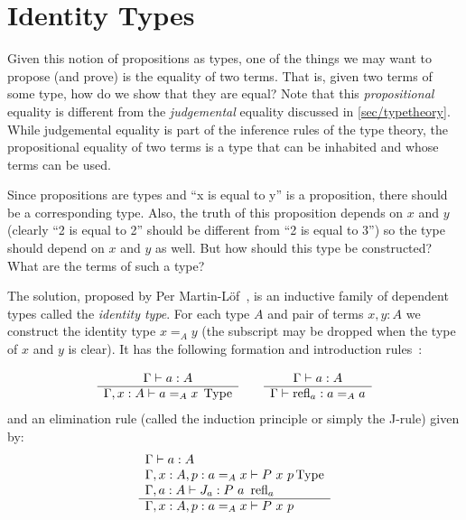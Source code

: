 \section{Identity Types}\label{sec/identitytypes}

Given this notion of propositions as types, one of the things we may want to
propose (and prove) is the equality of two terms. That is, given two terms of
some type, how do we show that they are equal? Note that this
\emph{propositional} equality is different from the \emph{judgemental} equality
discussed in \autoref{sec/typetheory}. While judgemental equality is part of the
inference rules of the type theory, the propositional equality of two terms is a
type that can be inhabited and whose terms can be used. 

Since propositions are types and ``x is equal to y'' is a proposition, there
should be a corresponding type. Also, the truth of this proposition depends on
$x$ and $y$ (clearly ``2 is equal to 2'' should be different from ``2 is equal
to 3'') so the type should depend on $x$ and $y$ as well. But how should this
type be constructed? What are the terms of such a type?

The solution, proposed by Per Martin-Löf~\cite{ML75}, is an inductive family of dependent
types called the \emph{identity type}. For each type $A$ and pair of terms
$x,y:A$ we construct the identity type $x =_A y$ (the subscript may be dropped
when the type of $x$ and $y$ is clear). It has the following formation and introduction
rules~\cite{Rijke2019}:

\[
  \begin{array}[t]{c}
    \Gamma \vdash a:A\\
    \hline
    \Gamma, x:A \vdash a =_A x \; \operatorname{Type}\\
  \end{array}
  \qquad
  \begin{array}[t]{c}
    \Gamma \vdash a:A\\
    \hline
    \Gamma \vdash \operatorname{refl}_a : a =_A a
  \end{array}
\]
and an elimination rule (called the induction principle or simply the J-rule) given by:
\[
  \begin{array}[t]{l}
    \Gamma \vdash a:A\\
    \Gamma, x:A, p:a =_A x \vdash P~x~p \operatorname{Type}\\
    \Gamma, a:A \vdash J_a : P~a~\operatorname{refl}_a\\
    \hline
    \Gamma, x:A, p:a=_Ax \vdash P~x~p
  \end{array}
\]

